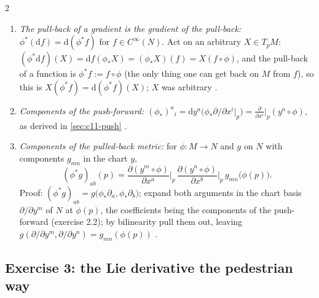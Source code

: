 \begin{paracol}{2}
\begin{enumerate}
  \item \emph{The pull-back of a gradient is the gradient of the pull-back:} $\phi^*(\mathrm df)=\mathrm d(\phi^*f)$ for $f\in C^\infty(N)$. Act on an arbitrary $X\in T_pM$: $(\phi^*\mathrm df)(X)=\mathrm df(\phi_*X)=(\phi_*X)(f)=X(f\circ\phi)$, and the pull-back of a function is $\phi^*f:=f\circ\phi$ (the only thing one can get back on $M$ from $f$), so this is $X(\phi^*f)=\mathrm d(\phi^*f)(X)$; $X$ was arbitrary .
  \item \emph{Components of the push-forward:} $(\phi_*)^a{}_i=\mathrm dy^a\bigl(\phi_*\partial/\partial x^i|_p\bigr)=\frac{\partial}{\partial x^i}\big|_p(y^a\circ\phi)$, as derived in \cref{sec:c11-push} .
  \item \emph{Components of the pulled-back metric:} for $\phi\colon M\to N$ and $g$ on $N$ with components $g_{mn}$ in the chart $y$,
        \[
          (\phi^*g)_{ab}(p)=\frac{\partial(y^m\circ\phi)}{\partial x^a}\Big|_p\,\frac{\partial(y^n\circ\phi)}{\partial x^b}\Big|_p\,g_{mn}\bigl(\phi(p)\bigr).
        \]
        Proof: $(\phi^*g)_{ab}=g\bigl(\phi_*\partial_a,\phi_*\partial_b\bigr)$; expand both arguments in the chart basis $\partial/\partial y^m$ of $N$ at $\phi(p)$, the coefficients being the components of the push-forward (exercise 2.2); by bilinearity pull them out, leaving $g(\partial/\partial y^m,\partial/\partial y^n)=g_{mn}(\phi(p))$ .
\end{enumerate}

\subsection*{Exercise 3: the Lie derivative the pedestrian way}


\end{paracol}
